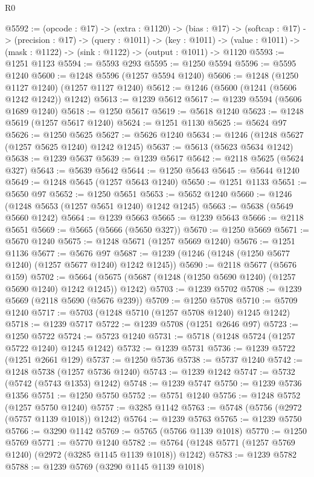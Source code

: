 \begin{lexlean}{R0}
\begin{coremodule}
@5592 := (opcode : @17) ->
  (extra : @1120) ->
  (bias : @17) ->
  (softcap : @17) ->
  (precision : @17) ->
  (query : @1011) ->
  (key : @1011) -> (value : @1011) -> (mask : @1122) -> (sink : @1122) -> (output : @1011) -> @1120
@5593 := @1251 @1123
@5594 := @5593 @293
@5595 := @1250 @5594
@5596 := @5595 @1240
@5600 := @1248 @5596 (@1257 @5594 @1240)
@5606 := @1248 (@1250 @1127 @1240) (@1257 @1127 @1240)
@5612 := @1246 (@5600 (@1241 (@5606 @1242 @1242)) @1242)
@5613 := @1239 @5612
@5617 := @1239 @5594 (@5606 @1689 @1240)
@5618 := @1250 @5617
@5619 := @5618 @1240
@5623 := @1248 @5619 (@1257 @5617 @1240)
@5624 := @1251 @1130
@5625 := @5624 @97
@5626 := @1250 @5625
@5627 := @5626 @1240
@5634 := @1246 (@1248 @5627 (@1257 @5625 @1240) @1242 @1245)
@5637 := @5613 (@5623 @5634 @1242)
@5638 := @1239 @5637
@5639 := @1239 @5617
@5642 := @2118 @5625 (@5624 @327)
@5643 := @5639 @5642
@5644 := @1250 @5643
@5645 := @5644 @1240
@5649 := @1248 @5645 (@1257 @5643 @1240)
@5650 := @1251 @1133
@5651 := @5650 @97
@5652 := @1250 @5651
@5653 := @5652 @1240
@5660 := @1246 (@1248 @5653 (@1257 @5651 @1240) @1242 @1245)
@5663 := @5638 (@5649 @5660 @1242)
@5664 := @1239 @5663
@5665 := @1239 @5643
@5666 := @2118 @5651
@5669 := @5665 (@5666 (@5650 @327))
@5670 := @1250 @5669
@5671 := @5670 @1240
@5675 := @1248 @5671 (@1257 @5669 @1240)
@5676 := @1251 @1136
@5677 := @5676 @97
@5687 := @1239 (@1246 (@1248 (@1250 @5677 @1240) (@1257 @5677 @1240) @1242 @1245))
@5690 := @2118 @5677 (@5676 @159)
@5702 := @5664 (@5675 (@5687 (@1248 (@1250 @5690 @1240) (@1257 @5690 @1240) @1242 @1245)) @1242)
@5703 := @1239 @5702
@5708 := @1239 @5669 (@2118 @5690 (@5676 @239))
@5709 := @1250 @5708
@5710 := @5709 @1240
@5717 := @5703 (@1248 @5710 (@1257 @5708 @1240) @1245 @1242)
@5718 := @1239 @5717
@5722 := @1239 @5708 (@1251 @2646 @97)
@5723 := @1250 @5722
@5724 := @5723 @1240
@5731 := @5718 (@1248 @5724 (@1257 @5722 @1240) @1245 @1242)
@5732 := @1239 @5731
@5736 := @1239 @5722 (@1251 @2661 @129)
@5737 := @1250 @5736
@5738 := @5737 @1240
@5742 := @1248 @5738 (@1257 @5736 @1240)
@5743 := @1239 @1242
@5747 := @5732 (@5742 (@5743 @1353) @1242)
@5748 := @1239 @5747
@5750 := @1239 @5736 @1356
@5751 := @1250 @5750
@5752 := @5751 @1240
@5756 := @1248 @5752 (@1257 @5750 @1240)
@5757 := @3285 @1142
@5763 := @5748 (@5756 (@2972 (@5757 @1139 @1018)) @1242)
@5764 := @1239 @5763
@5765 := @1239 @5750
@5766 := @3290 @1142
@5769 := @5765 (@5766 @1139 @1018)
@5770 := @1250 @5769
@5771 := @5770 @1240
@5782 := @5764 (@1248 @5771 (@1257 @5769 @1240) (@2972 (@3285 @1145 @1139 @1018)) @1242)
@5783 := @1239 @5782
@5788 := @1239 @5769 (@3290 @1145 @1139 @1018)

\end{coremodule}
\end{lexlean}
